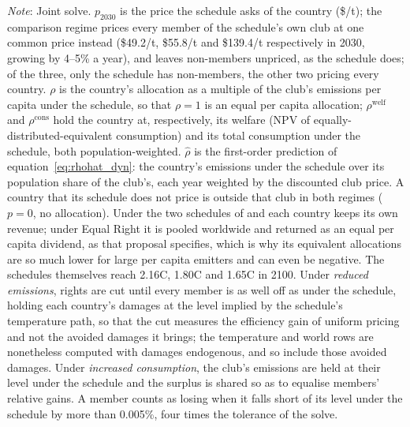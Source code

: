 \documentclass[12pt,english]{article}
\theoremstyle{remark}
\begin{document}
\begin{table}[!ht]
\centering
\small
\singlespacing
\caption{Equivalent rights of three differentiated-price schedules, and the dividend of a uniform price}
\label{tab:equiv_rights_main}
\begin{minipage}{\textwidth}\footnotesize\singlespacing
\emph{Note}: Joint solve. $p_{2030}$ is the price the schedule asks of the country (\$/t); the comparison regime prices every member of the schedule's own club at one common price instead (\$49.2/t, \$55.8/t and \$139.4/t respectively in 2030, growing by 4--5\% a year), and leaves non-members unpriced, as the schedule does; of the three, only the \citet{wolfram_building_2025} schedule has non-members, the other two pricing every country. $\rho$ is the country's allocation as a multiple of the club's emissions per capita under the schedule, so that $\rho=1$ is an equal per capita allocation; $\rho^{\mathrm{welf}}$ and $\rho^{\mathrm{cons}}$ hold the country at, respectively, its welfare (NPV of equally-distributed-equivalent consumption) and its total consumption under the schedule, both population-weighted. $\hat\rho$ is the first-order prediction of equation~\eqref{eq:rhohat_dyn}: the country's emissions under the schedule over its population share of the club's, each year weighted by the discounted club price. A country that its schedule does not price is outside that club in both regimes ($p=0$, no allocation). Under the two schedules of \citet{wolfram_building_2025} and \citet{banerjee_grand_2025} each country keeps its own revenue; under Equal Right it is pooled worldwide and returned as an equal per capita dividend, as that proposal specifies, which is why its equivalent allocations are so much lower for large per capita emitters and can even be negative. The schedules themselves reach 2.16\textdegree C, 1.80\textdegree C and 1.65\textdegree C in 2100. Under \emph{reduced emissions}, rights are cut until every member is as well off as under the schedule, holding each country's damages at the level implied by the schedule's temperature path, so that the cut measures the efficiency gain of uniform pricing and not the avoided damages it brings; the temperature and world rows are nonetheless computed with damages endogenous, and so include those avoided damages. Under \emph{increased consumption}, the club's emissions are held at their level under the schedule and the surplus is shared so as to equalise members' relative gains. A member counts as losing when it falls short of its level under the schedule by more than 0.005\%, four times the tolerance of the solve.
\end{minipage}
\end{table}
\FloatBarrier   %
\end{document}
